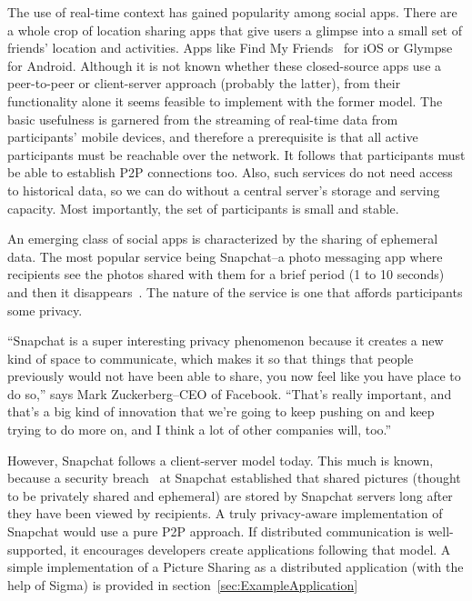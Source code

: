 \documentclass[prodmode]{acmlarge}
\begin{document}
The use of real-time context has gained popularity among social apps. There are a whole crop of location sharing apps that give users a glimpse into a small set of friends' location and activities. Apps like Find My Friends~\cite{FindMyFriends} for iOS or Glympse~\cite{Glympse} for Android. Although it is not known whether these closed-source apps use a peer-to-peer or client-server approach (probably the latter), from their functionality alone it seems feasible to implement with the former model. The basic usefulness is garnered from the streaming of real-time data from participants' mobile devices, and therefore a prerequisite is that all active participants must be reachable over the network. It follows that participants must be able to establish P2P connections too. Also, such services do not need access to historical data, so we can do without a central server's storage and serving capacity. Most importantly, the set of participants is small and stable.

An emerging class of social apps is characterized by the sharing of ephemeral data. The most popular service being Snapchat--a photo messaging app where recipients see the photos shared with them for a brief period (1 to 10 seconds) and then it disappears~\cite{Snapchat}. The nature of the service is one that affords participants some privacy.

``Snapchat is a super interesting privacy phenomenon because it creates a new kind of space to communicate, which makes it so that things that people previously would not have been able to share, you now feel like you have place to do so,'' says Mark Zuckerberg--CEO of Facebook. ``That's really important, and that's a big kind of innovation that we're going to keep pushing on and keep trying to do more on, and I think a lot of other companies will, too.''~\cite{Zuckerberg}

However, Snapchat follows a client-server model today. This much is known, because a security breach~\cite{SnapchatHack} at Snapchat established that shared pictures (thought to be privately shared and ephemeral) are stored by Snapchat servers long after they have been viewed by recipients. A truly privacy-aware implementation of Snapchat would use a pure P2P approach. If distributed communication is well-supported, it encourages developers create applications following that model. A simple implementation of a Picture Sharing as a distributed application (with the help of Sigma) is provided in section~\ref{sec:ExampleApplication}
\end{document}
